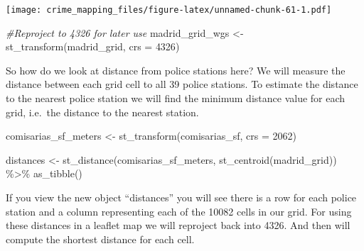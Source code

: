 \documentclass[
]{book}
\newenvironment{Shaded}{\begin{snugshade}}{\end{snugshade}}
\newcommand{\AttributeTok}[1]{\textcolor[rgb]{0.77,0.63,0.00}{#1}}
\newcommand{\CommentTok}[1]{\textcolor[rgb]{0.56,0.35,0.01}{\textit{#1}}}
\newcommand{\DecValTok}[1]{\textcolor[rgb]{0.00,0.00,0.81}{#1}}
\newcommand{\FunctionTok}[1]{\textcolor[rgb]{0.00,0.00,0.00}{#1}}
\newcommand{\NormalTok}[1]{#1}
\newcommand{\OtherTok}[1]{\textcolor[rgb]{0.56,0.35,0.01}{#1}}
\newcommand{\SpecialCharTok}[1]{\textcolor[rgb]{0.00,0.00,0.00}{#1}}
\begin{document}
\texttt{[image: crime\_mapping\_files/figure-latex/unnamed-chunk-61-1.pdf]}

\begin{Shaded}
\begin{Highlighting}[]
\CommentTok{\#Reproject to 4326 for later use}
\NormalTok{madrid\_grid\_wgs }\OtherTok{\textless{}{-}} \FunctionTok{st\_transform}\NormalTok{(madrid\_grid, }\AttributeTok{crs =} \DecValTok{4326}\NormalTok{)}
\end{Highlighting}
\end{Shaded}

So how do we look at distance from police stations here? We will measure the distance between each grid cell to all 39 police stations. To estimate the distance to the nearest police station we will find the minimum distance value for each grid, i.e.~the distance to the nearest station.

\begin{Shaded}
\begin{Highlighting}[]
\NormalTok{comisarias\_sf\_meters }\OtherTok{\textless{}{-}} \FunctionTok{st\_transform}\NormalTok{(comisarias\_sf, }\AttributeTok{crs =} \DecValTok{2062}\NormalTok{)}

\NormalTok{distances }\OtherTok{\textless{}{-}} \FunctionTok{st\_distance}\NormalTok{(comisarias\_sf\_meters, }\FunctionTok{st\_centroid}\NormalTok{(madrid\_grid)) }\SpecialCharTok{\%\textgreater{}\%} 
\FunctionTok{as\_tibble}\NormalTok{()}
\end{Highlighting}
\end{Shaded}

If you view the new object ``distances'' you will see there is a row for each police station and a column representing each of the 10082 cells in our grid. For using these distances in a leaflet map we will reproject back into 4326. And then will compute the shortest distance for each cell.
\end{document}
